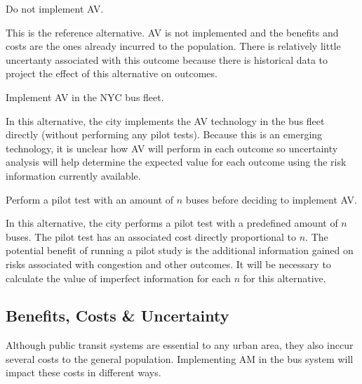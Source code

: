 \documentclass[11pt, letterpaper]{article}
\begin{document}
\begin{description}[leftmargin=0pt]
\item[Alternative 1:] Do not implement AV.

This is the reference alternative. AV is not implemented and the
benefits and costs are the ones already incurred to the population.
There is relatively little uncertanty associated with this outcome
because there is historical data to project the effect of this
alternative on outcomes.

\item[Alternative 2:] Implement AV in the NYC bus fleet.

In this alternative, the city implements the AV technology in the bus
fleet directly (without performing any pilot tests).  Because this is
an emerging technology, it is unclear how AV will perform in each
outcome so uncertainty analysis will help determine the expected value
for each outcome using the risk information currently available.

\item[Alternative 3:] Perform a pilot test with an amount of $n$ buses
  before deciding to implement AV.

In this alternative, the city performs a pilot test with a predefined
amount of $n$ buses. The pilot test has an associated cost directly
proportional to $n$.  The potential benefit of running a pilot study
is the additional information gained on risks associated with
congestion and other outcomes.  It will be necessary to calculate the
value of imperfect information for each $n$ for this alternative.


\end{description}

\subsection{Benefits, Costs \& Uncertainty}

Although public transit systems are essential to any urban area, they 
also inccur several costs to the general population. Implementing AM 
in the bus system will impact these costs in different ways.
\end{document}
